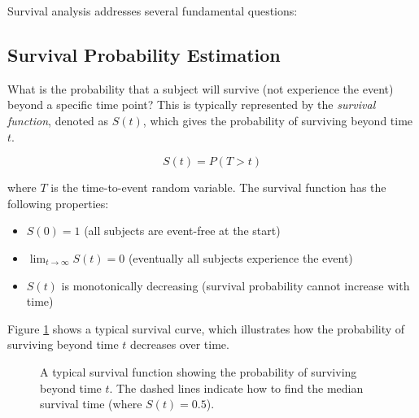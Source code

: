 Survival analysis addresses several fundamental questions:

\subsection{Survival Probability Estimation}

What is the probability that a subject will survive (not experience the event) beyond a specific time point? This is typically represented by the \textit{survival function}, denoted as $S(t)$, which gives the probability of surviving beyond time $t$.

\begin{equationbox}[title=Survival Function]
\begin{equation}
S(t) = P(T > t)
\end{equation}

where $T$ is the time-to-event random variable. The survival function has the following properties:
\begin{itemize}
    \item $S(0) = 1$ (all subjects are event-free at the start)
    \item $\lim_{t \to \infty} S(t) = 0$ (eventually all subjects experience the event)
    \item $S(t)$ is monotonically decreasing (survival probability cannot increase with time)
\end{itemize}
\end{equationbox}

Figure \ref{fig:survival-function} shows a typical survival curve, which illustrates how the probability of surviving beyond time $t$ decreases over time.

\begin{figure}[htbp]
    \centering
    \caption{A typical survival function showing the probability of surviving beyond time $t$. The dashed lines indicate how to find the median survival time (where $S(t) = 0.5$).}
    \label{fig:survival-function}
\end{figure}

